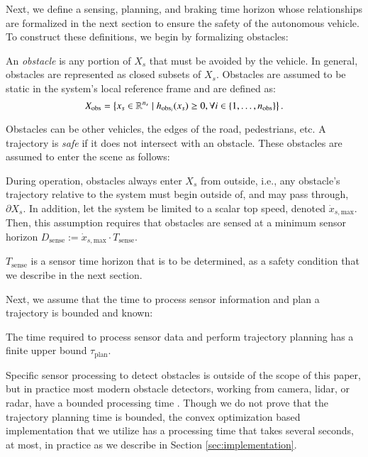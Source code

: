 Next, we define a sensing, planning, and braking time horizon whose relationships are formalized in the next section to ensure the safety of the autonomous vehicle. 
To construct these definitions, we begin by formalizing obstacles: 
\begin{defn}
An \emph{obstacle} is any portion of $X_s$ that must be avoided by the vehicle.
In general, obstacles are represented as closed subsets of $X_s$.
Obstacles are assumed to be static in the system's local reference frame and are defined as:
\begin{equation}
X_{\text{obs}} = \left\{ x_s \in \mathbb{R}^{n_s} \mid h_{\text{obs}_i}(x_s) \geq 0 , \forall i \in \{1,\ldots,n_{\text{obs}} \} \right\}.
\label{eq:X_obs}
\end{equation}
\end{defn}
Obstacles can be other vehicles, the edges of the road, pedestrians, etc.
A trajectory is \emph{safe} if it does not intersect with an obstacle.
These obstacles are assumed to enter the scene as follows:
\begin{assum}\label{ass:sense}
During operation, obstacles always enter $X_s$ from outside, i.e., any obstacle's trajectory relative to the system must begin outside of, and may pass through, $\partial X_s$.
In addition, let the system be limited to a scalar top speed, denoted $\dot{x}_{s,\text{max}}$.
Then, this assumption requires that obstacles are sensed at a minimum sensor horizon $D_\text{sense} := \dot{x}_{s,\text{max}}\cdot T_\text{sense}$.
\end{assum}
$T_\text{sense}$ is a sensor time horizon that is to be determined, as a safety condition that we describe in the next section. 

Next, we assume that the time to process sensor information and plan a trajectory is bounded and known:
\begin{assum}\label{ass:plan_and_scan}
The time required to process sensor data and perform trajectory planning has a finite upper bound $\tau_\text{plan}$.
\end{assum}
Specific sensor processing to detect obstacles is outside of the scope of this paper, but in practice most modern obstacle detectors, working from camera, lidar, or radar, have a bounded processing time \cite{johnson2016driving,liu2016ssd}.
Though we do not prove that the trajectory planning time is bounded, the convex optimization based implementation that we utilize has a processing time that takes several seconds, at most, in practice as we describe in Section \ref{sec:implementation}.

